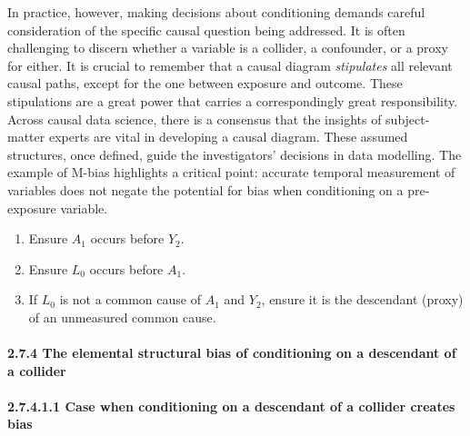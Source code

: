 \documentclass[
  singlecolumn]{article}
\let\oldparagraph\paragraph
\renewcommand{\paragraph}[1]{\oldparagraph{#1}\mbox{}}
\providecommand{\tightlist}{%
  \setlength{\itemsep}{0pt}\setlength{\parskip}{0pt}}\usepackage{longtable,booktabs,array}
\begin{document}
In practice, however, making decisions about conditioning demands
careful consideration of the specific causal question being addressed.
It is often challenging to discern whether a variable is a collider, a
confounder, or a proxy for either. It is crucial to remember that a
causal diagram \emph{stipulates} all relevant causal paths, except for
the one between exposure and outcome. These stipulations are a great
power that carries a correspondingly great responsibility. Across causal
data science, there is a consensus that the insights of subject-matter
experts are vital in developing a causal diagram. These assumed
structures, once defined, guide the investigators' decisions in data
modelling. The example of M-bias highlights a critical point: accurate
temporal measurement of variables does not negate the potential for bias
when conditioning on a pre-exposure variable.

\begin{enumerate}
\def\labelenumi{\arabic{enumi}.}
\tightlist
\item
  Ensure \(A_1\) occurs before \(Y_2\).
\item
  Ensure \(L_0\) occurs before \(A_1\).
\item
  If \(L_0\) is not a common cause of \(A_1\) and \(Y_2\), ensure it is
  the descendant (proxy) of an unmeasured common cause.
\end{enumerate}

\paragraph{2.7.4 The elemental structural bias of conditioning on a
descendant of a
collider}\label{the-elemental-structural-bias-of-conditioning-on-a-descendant-of-a-collider}

\paragraph{2.7.4.1.1 Case when conditioning on a descendant of a
collider creates
bias}\label{case-when-conditioning-on-a-descendant-of-a-collider-creates-bias}
\end{document}
